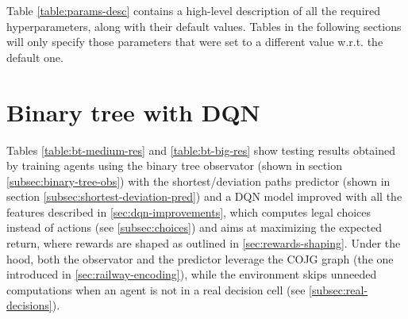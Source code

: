 \documentclass[a4paper,10pt]{report}
\renewcommand{\texttt}[1]{%
  \begingroup
  \ttfamily
  \begingroup\lccode`~=`.\lowercase{\endgroup\def~}{.\discretionary{}{}{}}%
  \catcode`/=\active\catcode`[=\active\catcode`.=\active
  \scantokens{#1\noexpand}%
  \endgroup
}
\begin{document}
\clearpage
{}

Table \ref{table:params-desc} contains a high-level description of all the required hyperparameters, along with their default values. Tables in the following sections will only specify those parameters that were set to a different value w.r.t. the default one.

\section{Binary tree with DQN}\label{sec:bt-dqn-res}

Tables \ref{table:bt-medium-res} and \ref{table:bt-big-res} show testing results obtained by training agents using the binary tree observator (shown in section \ref{subsec:binary-tree-obs}) with the shortest/deviation paths predictor (shown in section \ref{subsec:shortest-deviation-pred}) and a DQN model improved with all the features described in \ref{sec:dqn-improvements}, which computes legal choices instead of actions (see \ref{subsec:choices}) and aims at maximizing the expected return, where rewards are shaped as outlined in \ref{sec:rewards-shaping}. Under the hood, both the observator and the predictor leverage the COJG graph (the one introduced in \ref{sec:railway-encoding}), while the environment skips unneeded computations when an agent is not in a real decision cell (see \ref{subsec:real-decisions}).
\end{document}
